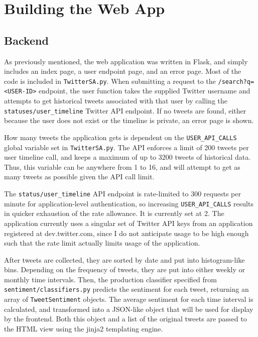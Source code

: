\documentclass[letter,12pt]{article}
\begin{document}
\section{Building the Web App}
\label{sec:web}

\subsection{Backend}

As previously mentioned, the web application was written in
Flask, and simply includes an index page, a user endpoint page, and an error
page. Most of the code is included in \texttt{TwitterSA.py}. When submitting a
request to the \texttt{/search?q=<USER-ID>} endpoint, the user function takes
the supplied Twitter username and attempts to get historical tweets associated
with that user by calling the \texttt{statuses/user\_timeline} Twitter API
endpoint. If no tweets are found, either because the user does not exist or the
timeline is private, an error page is shown.

How many tweets the application gets is dependent on the
\texttt{USER\_API\_CALLS} global variable set in \texttt{TwitterSA.py}. The API
enforces a limit of 200 tweets per user timeline call, and keeps a maximum
of up to 3200 tweets of historical data. Thus, this variable can be anywhere
from 1 to 16, and will attempt to get as many tweets as possible given the API
call limit.

The \texttt{status/user\_timeline} API endpoint is rate-limited to 300 requests
per minute for application-level authentication, so increasing
\texttt{USER\_API\_CALLS} results in quicker exhaustion of the rate allowance.
It is currently set at 2. The application currently uses a singular set of
Twitter API keys from an application registered at dev.twitter.com, since I do
not anticipate usage to be high enough such that the rate limit actually limits
usage of the application.

After tweets are collected, they are sorted by date and put into histogram-like
bins. Depending on the frequency of tweets, they are put into either weekly or
monthly time intervals. Then, the production classifier specified from
\texttt{sentiment/classifiers.py} predicts the sentiment for each tweet,
returning an array of \texttt{TweetSentiment} objects. The average sentiment
for each time interval is calculated, and transformed into a JSON-like object
that will be used for display by the frontend. Both this object and a list of
the original tweets are passed to the HTML view using the jinja2 templating
engine.
\end{document}
